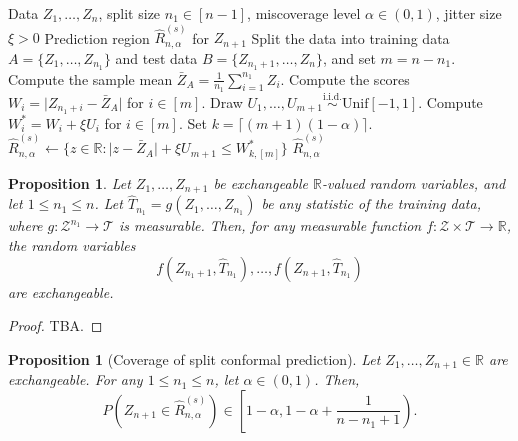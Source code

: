 \documentclass[a4paper,12pt]{article}
\numberwithin{equation}{section}
\newcommand{\iid}{\overset{\text{i.i.d.}}{\sim}}
\theoremstyle{plain}
\newtheorem{proposition}[theorem]{Proposition}
\theoremstyle{definition}
\theoremstyle{remark}
\begin{document}
\begin{algorithm}
  \caption{Split conformal prediction with centered scores}
  \label{algorithm:ch8-split-conformal-prediction}
  \begin{algorithmic}[1]
    \Require Data $Z_1,\dots,Z_n$, split size $n_1\in[n-1]$, miscoverage level $\alpha\in(0,1)$, jitter size $\xi>0$
    \Ensure Prediction region $\hat{R}_{n,\alpha}^{(s)}$ for $Z_{n+1}$
    \State Split the data into training data $A=\{Z_1,\dots,Z_{n_1}\}$ and test data $B=\{Z_{n_1+1},\dots,Z_n\}$, and set $m=n-n_1$.
    \State Compute the sample mean $\bar{Z}_A=\frac{1}{n_1}\sum_{i=1}^{n_1}Z_i$.
    \State Compute the scores $W_i=\lvert Z_{n_1+i}-\bar{Z}_A\rvert$ for $i\in[m]$.
    \State Draw $U_1,\dots,U_{m+1}\iid\mathrm{Unif}[-1,1]$.
    \State Compute $W_i^*=W_i+\xi U_i$ for $i\in[m]$.
    \State Set $k=\lceil(m+1)(1-\alpha)\rceil$.
    \State $\hat{R}_{n,\alpha}^{(s)}\gets\{z\in\mathbb{R}:\lvert z-\bar{Z}_A\rvert+\xi U_{m+1}\le W^*_{k,[m]}\}$
    \State \Return $\hat{R}_{n,\alpha}^{(s)}$
  \end{algorithmic}
\end{algorithm}

\begin{proposition}
  Let $Z_1,\dots,Z_{n+1}$ be exchangeable $\mathbb{R}$-valued random variables,
  and let $1\le n_1\le n$. Let $\hat{T}_{n_1}=g(Z_1,\dots,Z_{n_1})$ be any statistic
  of the training data, where $g:\mathcal{Z}^{n_1}\to\mathcal{T}$ is measurable.
  Then, for any measurable function $f:\mathcal{Z}\times\mathcal{T}\to\mathbb{R}$,
  the random variables
  \begin{equation*}
    f(Z_{n_1+1},\hat{T}_{n_1}),\dots,f(Z_{n+1},\hat{T}_{n_1})
  \end{equation*}
  are exchangeable.
\end{proposition}

\begin{proof}
    TBA.
\end{proof}

\begin{proposition}[Coverage of split conformal prediction]
    Let $Z_1,\dots,Z_{n+1}\in\mathbb{R}$ are exchangeable. For any $1\leq n_1\leq n$, let $\alpha\in(0,1)$. Then,
    \begin{equation}
        P\left(Z_{n+1}\in\hat{R}_{n,\alpha}^{(s)}\right)\in\left[1-\alpha,1-\alpha+\frac{1}{n-n_1+1}\right).
    \end{equation}
\end{proposition}
\end{document}

